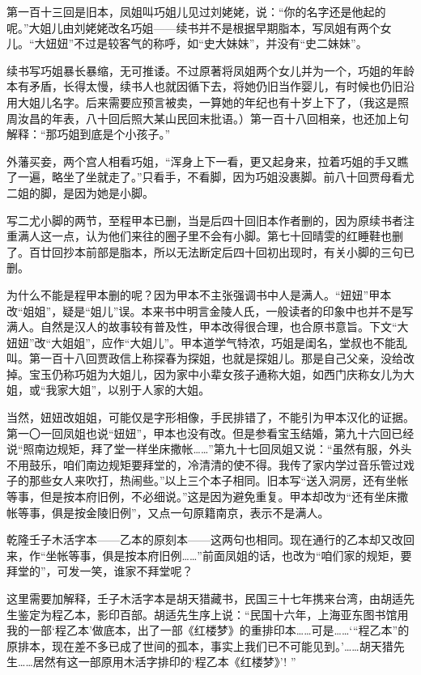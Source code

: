 \par 第一百十三回是旧本，凤姐叫巧姐儿见过刘姥姥，说：“你的名字还是他起的呢。”大姐儿由刘姥姥改名巧姐——续书并不是根据早期脂本，写凤姐有两个女儿。“大妞妞”不过是较客气的称呼，如“史大妹妹”，并没有“史二妹妹”。
\par 续书写巧姐暴长暴缩，无可推诿。不过原著将凤姐两个女儿并为一个，巧姐的年龄本有矛盾，长得太慢，续书人也就因循下去，将她仍旧当作婴儿，有时候也仍旧沿用大姐儿名字。后来需要应预言被卖，一算她的年纪也有十岁上下了，（我这是照周汝昌的年表，八十回后照大某山民回末批语。）第一百十八回相亲，也还加上句解释：“那巧姐到底是个小孩子。”
\par 外藩买妾，两个宫人相看巧姐，“浑身上下一看，更又起身来，拉着巧姐的手又瞧了一遍，略坐了坐就走了。”只看手，不看脚，因为巧姐没裹脚。前八十回贾母看尤二姐的脚，是因为她是小脚。
\par 写二尤小脚的两节，至程甲本已删，当是后四十回旧本作者删的，因为原续书者注重满人这一点，认为他们来往的圈子里不会有小脚。第七十回晴雯的红睡鞋也删了。百廿回抄本前部是脂本，所以无法断定后四十回初出现时，有关小脚的三句已删。
\par 为什么不能是程甲本删的呢？因为甲本不主张强调书中人是满人。“妞妞”甲本改“姐姐”，疑是“姐儿”误。本来书中明言金陵人氏，一般读者的印象中也并不是写满人。自然是汉人的故事较有普及性，甲本改得很合理，也合原书意旨。下文“大妞妞”改“大姐姐”，应作“大姐儿”。甲本道学气特浓，巧姐是闺名，堂叔也不能乱叫。第一百十八回贾政信上称探春为探姐，也就是探姐儿。那是自己父亲，没给改掉。宝玉仍称巧姐为大姐儿，因为家中小辈女孩子通称大姐，如西门庆称女儿为大姐，或“我家大姐”，以别于人家的大姐。
\par 当然，妞妞改姐姐，可能仅是字形相像，手民排错了，不能引为甲本汉化的证据。第一〇一回凤姐也说“妞妞”，甲本也没有改。但是参看宝玉结婚，第九十六回已经说“照南边规矩，拜了堂一样坐床撒帐……”第九十七回凤姐又说：“虽然有服，外头不用鼓乐，咱们南边规矩要拜堂的，冷清清的使不得。我传了家内学过音乐管过戏子的那些女人来吹打，热闹些。”以上三个本子相同。旧本写“送入洞房，还有坐帐等事，但是按本府旧例，不必细说。”这是因为避免重复。甲本却改为“还有坐床撒帐等事，俱是按金陵旧例”，又点一句原籍南京，表示不是满人。
\par 乾隆壬子木活字本——乙本的原刻本——这两句也相同。现在通行的乙本却又改回来，作“坐帐等事，俱是按本府旧例……”前面凤姐的话，也改为“咱们家的规矩，要拜堂的”，可发一笑，谁家不拜堂呢？
\par 这里需要加解释，壬子木活字本是胡天猎藏书，民国三十七年携来台湾，由胡适先生鉴定为程乙本，影印百部。胡适先生序上说：“民国十六年，上海亚东图书馆用我的一部‘程乙本’做底本，出了一部《红楼梦》的重排印本……可是……‘“程乙本”的原排本，现在差不多已成了世间的孤本，事实上我们已不可能见到。'……胡天猎先生……居然有这一部原用木活字排印的‘程乙本《红楼梦》'! ”
